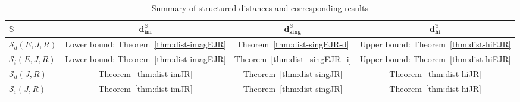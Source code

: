 \documentclass[11pt]{article}
\begin{document}
\begin{table}[h!]\label{tablesummary}
\centering
\renewcommand{\arraystretch}{1.5}
\begin{tabular}{lccc}
\hline
\textbf{$\mathbb  S$}
& $\mathbf{d_{im}^{\mathbb S}}$
& $\mathbf{d_{sing}^{\mathbb S}}$
& $\mathbf{d_{hi}^{\mathbb S}}$ \\
\hline
$\mathcal S_d(E,J,R)$
& Lower bound: Theorem~\ref{thm:dist-imagEJR}
& Theorem~\ref{thm:dist-singEJR-d}
& Upper bound: Theorem~\ref{thm:dist-hiEJR} \\
%
$\mathcal S_i(E,J,R)$
& Lower bound: Theorem~\ref{thm:dist-imagEJR}
& Theorem~\ref{thm:dist_singEJR_i}
& Upper bound: Theorem~\ref{thm:dist-hiEJR} \\
%
$\mathcal S_d(J,R)$
& Theorem~\ref{thm:dist-imJR}
& Theorem~\ref{thm:dist-singJR}
& Theorem~\ref{thm:dist-hiJR} \\

$\mathcal S_i(J,R)$
& Theorem~\ref{thm:dist-imJR}
& Theorem~\ref{thm:dist-singJR}
& Theorem~\ref{thm:dist-hiJR} \\
\hline
\end{tabular}
\caption{Summary of structured distances and corresponding results}
\end{table}
\end{document}
